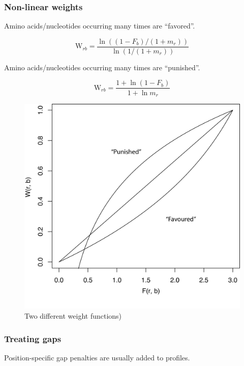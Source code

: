 %
%
\subsubsection*{Non-linear weights}
Amino acids/nucleotides occurring many times are ``favored''.

\[
\mathrm{W}_{rb} = \dfrac{ \ln((1-F_b)/(1+m_r)) }{ \ln(1/(1+m_r)) }
\]

\bigskip 

\noindent
Amino acids/nucleotides occurring many times are ``punished''.

\[
\mathrm{W}_{rb} = \dfrac{ 1 + \ln(1-F_b) }{ 1 + \ln m_r }
\]

\bigskip 

\begin{figure}[H]
  \centering
      \includegraphics[width=0.3 \textwidth]{fig12/weight_functions.png}
  \caption{Two different weight functions)}
\end{figure}

%
%
\subsubsection*{Treating gaps}
Position-specific gap penalties are usually added to profiles.

\bigskip 

%
